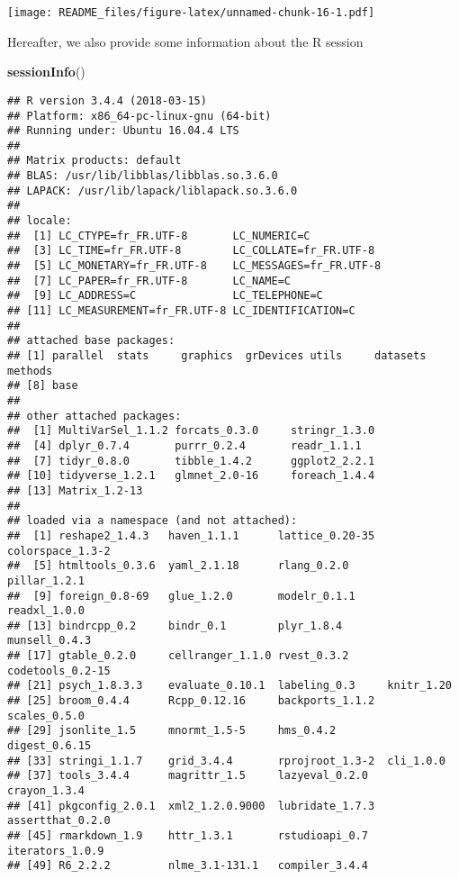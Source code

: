 \documentclass[]{article}
\newenvironment{Shaded}{\begin{snugshade}}{\end{snugshade}}
\newcommand{\KeywordTok}[1]{\textcolor[rgb]{0.13,0.29,0.53}{\textbf{#1}}}
\newcommand{\NormalTok}[1]{#1}
\begin{document}
\texttt{[image: README\_files/figure-latex/unnamed-chunk-16-1.pdf]}

Hereafter, we also provide some information about the R session

\begin{Shaded}
\begin{Highlighting}[]
 \KeywordTok{sessionInfo}\NormalTok{()}
\end{Highlighting}
\end{Shaded}

\begin{verbatim}
## R version 3.4.4 (2018-03-15)
## Platform: x86_64-pc-linux-gnu (64-bit)
## Running under: Ubuntu 16.04.4 LTS
## 
## Matrix products: default
## BLAS: /usr/lib/libblas/libblas.so.3.6.0
## LAPACK: /usr/lib/lapack/liblapack.so.3.6.0
## 
## locale:
##  [1] LC_CTYPE=fr_FR.UTF-8       LC_NUMERIC=C              
##  [3] LC_TIME=fr_FR.UTF-8        LC_COLLATE=fr_FR.UTF-8    
##  [5] LC_MONETARY=fr_FR.UTF-8    LC_MESSAGES=fr_FR.UTF-8   
##  [7] LC_PAPER=fr_FR.UTF-8       LC_NAME=C                 
##  [9] LC_ADDRESS=C               LC_TELEPHONE=C            
## [11] LC_MEASUREMENT=fr_FR.UTF-8 LC_IDENTIFICATION=C       
## 
## attached base packages:
## [1] parallel  stats     graphics  grDevices utils     datasets  methods  
## [8] base     
## 
## other attached packages:
##  [1] MultiVarSel_1.1.2 forcats_0.3.0     stringr_1.3.0    
##  [4] dplyr_0.7.4       purrr_0.2.4       readr_1.1.1      
##  [7] tidyr_0.8.0       tibble_1.4.2      ggplot2_2.2.1    
## [10] tidyverse_1.2.1   glmnet_2.0-16     foreach_1.4.4    
## [13] Matrix_1.2-13    
## 
## loaded via a namespace (and not attached):
##  [1] reshape2_1.4.3   haven_1.1.1      lattice_0.20-35  colorspace_1.3-2
##  [5] htmltools_0.3.6  yaml_2.1.18      rlang_0.2.0      pillar_1.2.1    
##  [9] foreign_0.8-69   glue_1.2.0       modelr_0.1.1     readxl_1.0.0    
## [13] bindrcpp_0.2     bindr_0.1        plyr_1.8.4       munsell_0.4.3   
## [17] gtable_0.2.0     cellranger_1.1.0 rvest_0.3.2      codetools_0.2-15
## [21] psych_1.8.3.3    evaluate_0.10.1  labeling_0.3     knitr_1.20      
## [25] broom_0.4.4      Rcpp_0.12.16     backports_1.1.2  scales_0.5.0    
## [29] jsonlite_1.5     mnormt_1.5-5     hms_0.4.2        digest_0.6.15   
## [33] stringi_1.1.7    grid_3.4.4       rprojroot_1.3-2  cli_1.0.0       
## [37] tools_3.4.4      magrittr_1.5     lazyeval_0.2.0   crayon_1.3.4    
## [41] pkgconfig_2.0.1  xml2_1.2.0.9000  lubridate_1.7.3  assertthat_0.2.0
## [45] rmarkdown_1.9    httr_1.3.1       rstudioapi_0.7   iterators_1.0.9 
## [49] R6_2.2.2         nlme_3.1-131.1   compiler_3.4.4
\end{verbatim}
\end{document}
